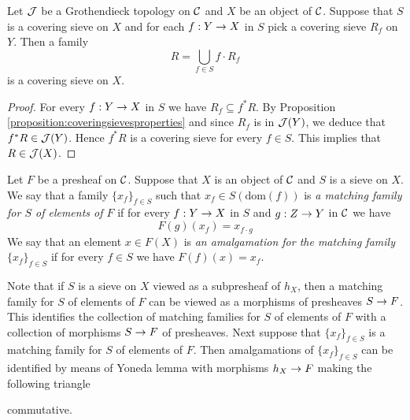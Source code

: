 \begin{fact}\label{fact:compositionofcoveringsieves}
Let ${\mathcal J}$ be a Grothendieck topology on ${\mathcal C}$ and $X$ be an object of ${\mathcal C}$. Suppose that $S$ is a covering sieve on $X$ and for each $f:Y\rightarrow X$ in $S$ pick a covering sieve $R_f$ on $Y$. Then a family
$$R=\bigcup_{f\in S}f\cdot R_f$$ 
is a covering sieve on $X$.
\end{fact}
\begin{proof}
For every $f:Y\rightarrow X$ in $S$ we have $R_f\subseteq f^*R$. By Proposition \ref{proposition:coveringsievesproperties} and since $R_f$ is in ${\mathcal J}(Y)$, we deduce that $f^*R\in {\mathcal J}(Y)$. Hence $f^*R$ is a covering sieve for every $f\in S$. This implies that $R\in {\mathcal J}(X)$.
\end{proof}

\begin{definition}
Let $F$ be a presheaf on ${\mathcal C}$. Suppose that $X$ is an object of ${\mathcal C}$ and $S$ is a sieve on $X$. We say that a family $\{x_f\}_{f\in S}$ such that $x_f\in S(\mathrm{dom}(f))$ is \textit{a matching family for $S$ of elements of $F$} if for every $f:Y\rightarrow X$ in $S$ and $g:Z\rightarrow Y$ in ${\mathcal C}$ we have
$$F(g)(x_f)=x_{f\cdot g}$$
We say that an element $x\in F(X)$ is \textit{an amalgamation for the matching family} $\{x_f\}_{f\in S}$ if for every $f\in S$ we have $F(f)(x)=x_f$.
\end{definition}
\noindent
Note that if $S$ is a sieve on $X$ viewed as a subpresheaf of $h_X$, then a matching family for $S$ of elements of $F$ can be viewed as a morphisms of presheaves $S\rightarrow F$. This identifies the collection of matching families for $S$ of elements of $F$ with a collection of morphisms $S\rightarrow F$ of presheaves. Next suppose that $\{x_f\}_{f\in S}$ is a matching family for $S$ of elements of $F$. Then amalgamations of $\{x_f\}_{f\in S}$ can be identified by means of Yoneda lemma {\cite[Theorem 3.3]{Presheaves}} with morphisms $h_X\rightarrow F$ making the following triangle
\begin{center}
\end{center}
commutative. 

